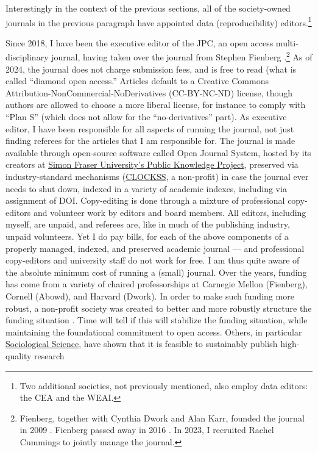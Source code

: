 \documentclass{article}
\begin{document}
Interestingly in the context of the previous sections, all of the society-owned journals in the previous paragraph have appointed  data (reproducibility) editors.\footnote{Two additional societies, not previously mentioned, also employ data editors: the \ac{CEA} and the \ac{WEAI}. }

Since 2018, I have been the executive editor of the \ac{JPC}, an open access multi-disciplinary journal, having taken over the journal from Stephen Fienberg \citep{vilhuber_relaunching_2018}.\footnote{Fienberg, together with Cynthia Dwork and Alan Karr, founded the journal in 2009 \citep{abowd_first_2009}. Fienberg passed away in 2016 \citep{slavkovic_remembering_2018}.  In 2023, I recruited Rachel Cummings to jointly manage the journal.} As of 2024, the journal does not charge submission fees, and is free to read (what is called ``diamond open access.'' Articles default to a Creative Commons Attribution-NonCommercial-NoDerivatives (CC-BY-NC-ND) license, though authors are allowed to choose a more liberal license, for instance to comply with ``Plan S'' (which does not allow for the ``no-derivatives'' part). As executive editor, I have been responsible for all aspects of running the journal, not just finding referees for the articles that I am responsible for. The journal is made available through open-source software called Open Journal System, hosted by its creators at \href{https://pkp.sfu.ca/hosting-services/hosting/journals/}{Simon Fraser University's Public Knowledge Project}, preserved via industry-standard mechanisms (\href{https://clockss.org/about/how-clockss-works/}{CLOCKSS}, a non-profit) in case the journal ever needs to shut down, indexed in a variety of academic indexes, including via assignment of \acs{DOI}. Copy-editing is done through a mixture of professional copy-editors and volunteer work by editors and board members. All editors, including myself, are unpaid, and referees are, like in much of the publishing industry, unpaid volunteers. Yet I do pay bills, for each of the above components of a properly managed, indexed, and preserved academic journal --- and professional copy-editors and university staff do not work for free. I am thus quite aware of the absolute minimum cost of running a (small) journal. Over the years, funding has come from a variety of chaired professorships at Carnegie Mellon (Fienberg), Cornell (Abowd), and Harvard (Dwork). In order to make such funding more robust, a non-profit society was created to better and more robustly structure the funding situation \citep{abowd_launching_2024}. Time will tell if this will stabilize the funding situation, while maintaining the foundational commitment to open access. Others, in particular \href{https://sociologicalscience.com/}{Sociological Science}, have shown that it is feasible to sustainably publish high-quality research 
\end{document}

